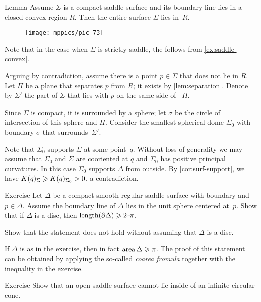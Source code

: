 \begin{thm}{Lemma}\label{lem:convex-saddle}
Assume $\Sigma$ is a compact saddle surface and its boundary line lies in a closed convex  region $R$.
Then the entire surface $\Sigma$ lies in~$R$.
\end{thm}

\begin{wrapfigure}{O}{45 mm}
\vskip-5mm
\centering
\texttt{[image: mppics/pic-73]}
\vskip0mm
\end{wrapfigure}


Note that in the case when $\Sigma$ is strictly saddle, the follows from \ref{ex:saddle-convex}.


Arguing by contradiction,
assume there is a point $p\in \Sigma$ that does not lie in $R$.
Let $\Pi$ be a plane that separates $p$ from $R$; it exists by \ref{lem:separation}.
Denote by $\Sigma'$ the part of $\Sigma$ that lies with $p$ on the same side of ~$\Pi$.

Since $\Sigma$ is compact, it is surrounded by a sphere;
let $\sigma$ be the circle of intersection of this sphere and $\Pi$.
Consider the smallest spherical dome $\Sigma_0$ with boundary $\sigma$ that surrounds~$\Sigma'$.

Note that $\Sigma_0$ supports $\Sigma$ at some point~$q$.
Without loss of generality we may assume that $\Sigma_0$ and $\Sigma$ are cooriented at $q$ and $\Sigma_0$ has positive principal curvatures.
In this case $\Sigma_0$ supports $\Delta$ from outside.
By \ref{cor:surf-support}, we have $K(q)_\Sigma\z\ge K(q)_{\Sigma_0}>0$, a contradiction.
\qeds

\begin{thm}{Exercise}\label{ex:length-of-bry}
Let $\Delta$ be a compact smooth regular saddle surface with boundary and $p\in \Delta$.
Assume the boundary line of $\Delta$ lies in the unit sphere centered at~$p$.
Show that if $\Delta$ is a disc, then $\length(\partial\Delta)\ge 2\cdot\pi$.

Show that the statement does not hold without assuming that $\Delta$ is a disc.
\end{thm}

If $\Delta$ is as in the exercise, then in fact $\mathop{\rm area}\nolimits \Delta\geqslant \pi$.
The proof of this statement can be obtained by applying the so-called \emph{coarea fromula} together with the inequality in the exercise. 

\begin{thm}{Exercise}\label{ex:circular-cone-saddle}
Show that an open saddle surface
cannot lie inside of an infinite circular cone. 
\end{thm}

